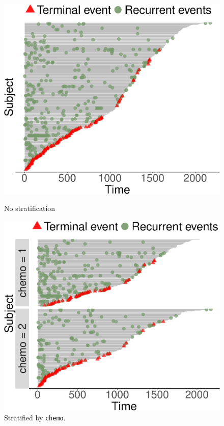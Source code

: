 \vspace*{-.3cm}
\begin{figure}[H]
    \centering
    \begin{minipage}{0.24\textwidth}
        \centering
        \includegraphics[scale = .25]{recur-figs/ep-1}
        \caption{No stratification}
    \end{minipage}\hfill
    \begin{minipage}{0.24\textwidth}
        \centering
        \includegraphics[scale = .25]{recur-figs/ep-2}
        \caption{Stratified by \texttt{chemo}.}
    \end{minipage}
\end{figure}
